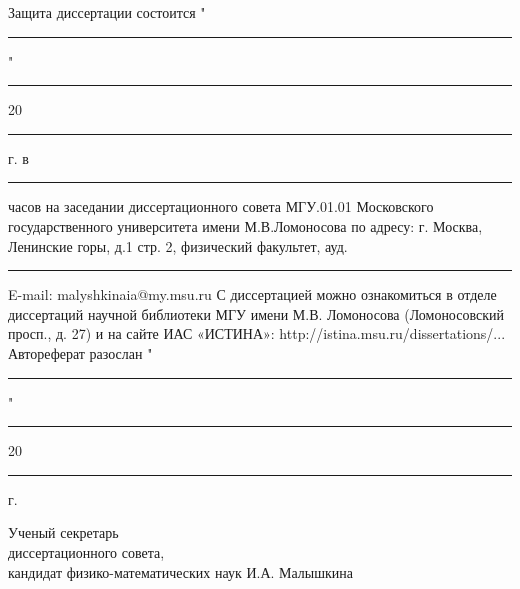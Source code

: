 \vfill


Защита диссертации состоится  "\rule{3mm}{0.15mm}" \rule{15mm}{0.15mm} 20\rule{3mm}{0.15mm} г. в \rule{5mm}{0.15mm} часов на заседании диссертационного совета МГУ.01.01 Московского государственного университета имени М.В.Ломоносова по адресу: г. Москва, Ленинские горы, д.1 стр. 2, физический факультет, ауд.\rule{5mm}{0.15mm}
\bigbreak
E-mail: malyshkinaia@my.msu.ru
\bigbreak
С диссертацией можно ознакомиться в отделе диссертаций научной библиотеки МГУ имени М.В. Ломоносова (Ломоносовский просп., д. 27) и на сайте ИАС «ИСТИНА»: http://istina.msu.ru/dissertations/...
Автореферат разослан "\rule{3mm}{0.15mm}" \rule{15mm}{0.15mm} 20\rule{3mm}{0.15mm} г.

\bigbreak

{\parindent0pt Ученый секретарь \\
диссертационного совета, \\
кандидат физико-математических наук \hfill	И.А. Малышкина}

\newpage
